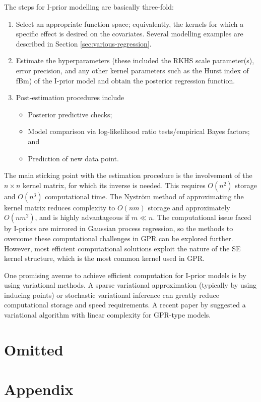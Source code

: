 \documentclass[a4paper,showframe,11pt]{report}
\begin{document}
The steps for I-prior modelling are basically three-fold:
\begin{enumerate}
  \item Select an appropriate function space; equivalently, the kernels for which a specific effect is desired on the covariates. Several modelling examples are described in Section \ref{sec:various-regression}.
  \item Estimate the hyperparameters (these included the RKHS scale parameter(s), error precision, and any other kernel parameters such as the Hurst index of fBm) of the I-prior model and obtain the posterior regression function.
  \item Post-estimation procedures include
  \begin{itemize}
    \item Posterior predictive checks;
    \item Model comparison via log-likelihood ratio tests/empirical Bayes factors; and
    \item Prediction of new data point.
  \end{itemize}
\end{enumerate}

The main sticking point with the estimation procedure is the involvement of the $n\times n$ kernel matrix, for which its inverse is needed.
This requires $O(n^2)$ storage and $O(n^3)$ computational time.
The Nyström method of approximating the kernel matrix reduces complexity to $O(nm)$ storage and approximately $O(nm^2)$, and is highly advantageous if $m \ll n$.
The computational issue faced by I-priors are mirrored in Gaussian process regression, so the methods to overcome these computational challenges in GPR can be explored further.
However, most efficient computational solutions exploit the nature of the SE kernel structure, which is the most common kernel used in GPR.

One promising avenue to achieve efficient computation for I-prior models is by using variational methods.
A sparse variational approximation (typically by using inducing points) or stochastic variational inference can greatly reduce computational storage and speed requirements.
A recent paper by \citet{cheng2017variational} suggested a variational algorithm with linear complexity for GPR-type models.


\section*{Omitted}


\ifstandalone
  \section*{Appendix}
  
  
\fi

\hClosingStuffStandalone
\end{document}
